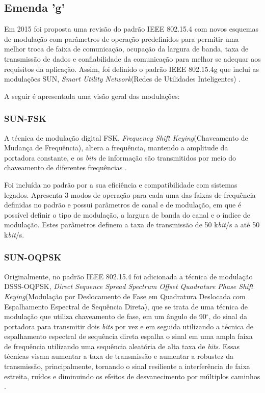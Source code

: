 \subsection*{Emenda 'g'}
Em 2015 foi proposta uma revisão do padrão IEEE 802.15.4 com novos esquemas de modulação com parâmetros de operação predefinidos para permitir uma melhor troca de faixa de comunicação, ocupação da largura de banda, taxa de transmissão de dados e confiabilidade da comunicação para melhor se adequar aos requisitos da aplicação. Assim, foi definido o padrão IEEE 802.15.4g que inclui as modulações SUN, \emph{Smart Utility Network}(Redes de Utilidades Inteligentes) \cite{tuset2020reliability}.

A seguir é apresentada uma visão geral das modulações:

\subsubsection*{SUN-FSK}
A técnica de modulação digital FSK, \emph{Frequency Shift Keying}(Chaveamento de Mudança de Frequência), altera a frequência, mantendo a amplitude da portadora constante, e os \emph{bits} de informação são transmitidos por meio do chaveamento de diferentes frequências \cite{lathi2012}.

Foi incluída no padrão por a sua eficiência e compatibilidade com sistemas legados. Apresenta 3 modos de operação para cada uma das faixas de frequência definidas no padrão e possui parâmetros de canal e de modulação, em que é possível definir o tipo de modulação, a largura de banda do canal e o índice de modulação. Estes parâmetros definem a taxa de transmissão de 50 k\emph{bit}/s a até 50 k\emph{bit}/s.

\subsubsection*{SUN-OQPSK}
Originalmente, no padrão IEEE 802.15.4 foi adicionada a técnica de modulação DSSS-OQPSK, \emph{Direct Sequence Spread Spectrum Offset Quadrature Phase Shift Keying}(Modulação por Deslocamento de Fase em Quadratura Deslocada com Espalhamento Espectral de Sequência Direta), que se trata de uma técnica de modulação que utiliza chaveamento de fase, em um ângulo de 90$^{\circ}$, do sinal da portadora para transmitir dois \emph{bits} por vez e em seguida utilizando a técnica de espalhamento espectral de sequência direta espalha o sinal em uma ampla faixa de frequência utilizando uma sequência aleatória de alta taxa de \emph{bits}. Essas técnicas visam aumentar a taxa de transmissão e aumentar a robustez da transmissão, principalmente, tornando o sinal resiliente a interferência de faixa estreita, ruídos e diminuindo os efeitos de desvanecimento por múltiplos caminhos \cite{goldsmith2005wireless}.

